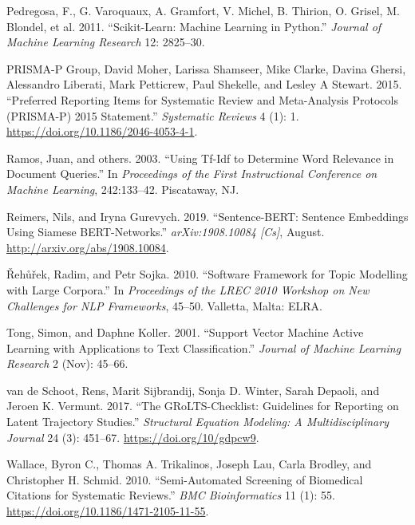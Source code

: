 \documentclass[
]{article}
\newlength{\cslhangindent}
\newenvironment{cslreferences}%
  {\setlength{\parindent}{0pt}%
  \everypar{\setlength{\hangindent}{\cslhangindent}}\ignorespaces}%
  {\par}
\begin{document}
\begin{cslreferences}
\leavevmode\hypertarget{ref-scikit-learn}{}%
Pedregosa, F., G. Varoquaux, A. Gramfort, V. Michel, B. Thirion, O.
Grisel, M. Blondel, et al. 2011. ``Scikit-Learn: Machine Learning in
Python.'' \emph{Journal of Machine Learning Research} 12: 2825--30.

\leavevmode\hypertarget{ref-PRISMA-PGroup2015}{}%
PRISMA-P Group, David Moher, Larissa Shamseer, Mike Clarke, Davina
Ghersi, Alessandro Liberati, Mark Petticrew, Paul Shekelle, and Lesley A
Stewart. 2015. ``Preferred Reporting Items for Systematic Review and
Meta-Analysis Protocols (PRISMA-P) 2015 Statement.'' \emph{Systematic
Reviews} 4 (1): 1. \url{https://doi.org/10.1186/2046-4053-4-1}.

\leavevmode\hypertarget{ref-Ramos2003}{}%
Ramos, Juan, and others. 2003. ``Using Tf-Idf to Determine Word
Relevance in Document Queries.'' In \emph{Proceedings of the First
Instructional Conference on Machine Learning}, 242:133--42. Piscataway,
NJ.

\leavevmode\hypertarget{ref-Reimers2019}{}%
Reimers, Nils, and Iryna Gurevych. 2019. ``Sentence-BERT: Sentence
Embeddings Using Siamese BERT-Networks.'' \emph{arXiv:1908.10084
{[}Cs{]}}, August. \url{http://arxiv.org/abs/1908.10084}.

\leavevmode\hypertarget{ref-Rehurek2010}{}%
Řehůřek, Radim, and Petr Sojka. 2010. ``Software Framework for Topic
Modelling with Large Corpora.'' In \emph{Proceedings of the LREC 2010
Workshop on New Challenges for NLP Frameworks}, 45--50. Valletta, Malta:
ELRA.

\leavevmode\hypertarget{ref-Tong2001}{}%
Tong, Simon, and Daphne Koller. 2001. ``Support Vector Machine Active
Learning with Applications to Text Classification.'' \emph{Journal of
Machine Learning Research} 2 (Nov): 45--66.

\leavevmode\hypertarget{ref-vandeSchoot2017}{}%
van de Schoot, Rens, Marit Sijbrandij, Sonja D. Winter,
Sarah Depaoli, and Jeroen K. Vermunt. 2017. ``The GRoLTS-Checklist:
Guidelines for Reporting on Latent Trajectory Studies.''
\emph{Structural Equation Modeling: A Multidisciplinary Journal} 24 (3):
451--67. \url{https://doi.org/10/gdpcw9}.

\leavevmode\hypertarget{ref-Wallace2010}{}%
Wallace, Byron C., Thomas A. Trikalinos, Joseph Lau, Carla Brodley, and
Christopher H. Schmid. 2010. ``Semi-Automated Screening of Biomedical
Citations for Systematic Reviews.'' \emph{BMC Bioinformatics} 11 (1):
55. \url{https://doi.org/10.1186/1471-2105-11-55}.


\end{cslreferences}
\end{document}
